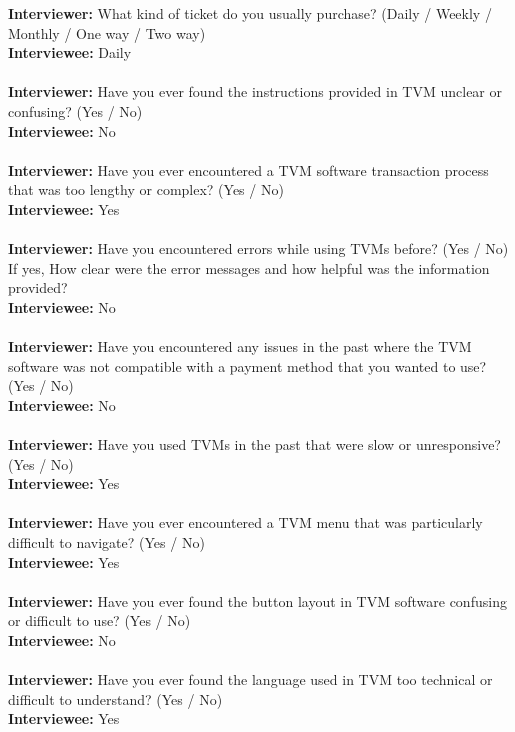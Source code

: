 \documentclass[a4paper,12pt]{report}
\begin{document}
\textbf{Interviewer:} What kind of ticket do you usually purchase? (Daily / Weekly /  Monthly / One way / Two way) \\
\textbf{Interviewee:} Daily\\\\
\textbf{Interviewer:} Have you ever found the instructions provided
in TVM unclear or confusing? (Yes / No)\\
\textbf{Interviewee:} No\\\\
\textbf{Interviewer:} Have you ever encountered a TVM software transaction process that was too lengthy or complex? (Yes / No)\\
\textbf{Interviewee:} Yes\\\\
\textbf{Interviewer:}  Have you encountered errors while using TVMs before? (Yes / No) If yes, How clear were the error messages and how helpful was the information provided?\\
\textbf{Interviewee:} No\\\\
\textbf{Interviewer:}  Have you encountered any issues in the past where the TVM software was not compatible with a payment method that you wanted to use? (Yes / No)\\
\textbf{Interviewee:} No\\\\
\textbf{Interviewer:}  Have you used TVMs in the past that were slow or unresponsive? (Yes / No)\\
\textbf{Interviewee:} Yes\\\\
\textbf{Interviewer:}  Have you ever encountered a TVM menu that was particularly difficult to navigate? (Yes / No)\\
\textbf{Interviewee:} Yes\\\\
\textbf{Interviewer:}  Have you ever found the button layout in TVM software confusing or difficult to use? (Yes / No) \\
\textbf{Interviewee:} No\\\\
\textbf{Interviewer:} Have you ever found the language used in TVM too technical or difficult to understand? (Yes / No) \\
\textbf{Interviewee:} Yes\\\\
\end{document}
